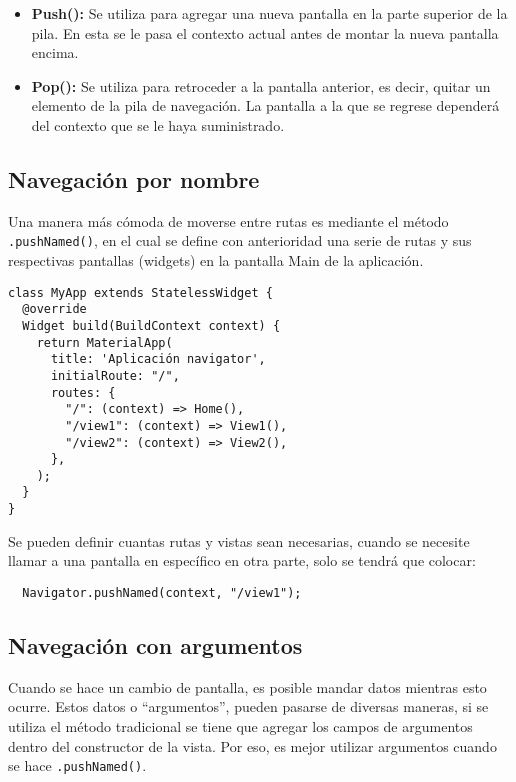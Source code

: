 \begin{itemize}
    \item \textbf{Push():} Se utiliza para agregar una nueva pantalla en la parte superior de la pila. En esta se le pasa el contexto actual antes de montar la nueva pantalla encima. 
    
    \item \textbf{Pop():} Se utiliza para retroceder a la pantalla anterior, es decir, quitar un elemento de la pila de navegación. La pantalla a la que se regrese dependerá del contexto que se le haya suministrado.
\end{itemize}

\subsection{Navegación por nombre}

Una manera más cómoda de moverse entre rutas es mediante el método \lstinline{.pushNamed()}, en el cual se define con anterioridad una serie de rutas y sus respectivas pantallas (widgets) en la pantalla Main de la aplicación.

\begin{center}
\begin{lstlisting}
class MyApp extends StatelessWidget {
  @override
  Widget build(BuildContext context) {
    return MaterialApp(
      title: 'Aplicación navigator',
      initialRoute: "/",
      routes: {
        "/": (context) => Home(),
        "/view1": (context) => View1(),
        "/view2": (context) => View2(),
      },
    );
  }
}
\end{lstlisting}
\end{center}

Se pueden definir cuantas rutas y vistas sean necesarias, cuando se necesite llamar a una pantalla en específico en otra parte, solo se tendrá que colocar:

\begin{center}
\begin{lstlisting}
  Navigator.pushNamed(context, "/view1");
\end{lstlisting}
\end{center}

\subsection{Navegación con argumentos}

Cuando se hace un cambio de pantalla, es posible mandar datos mientras esto ocurre. Estos datos o “argumentos”, pueden pasarse de diversas maneras, si se utiliza el método tradicional se tiene que agregar los campos de argumentos dentro del constructor de la vista. Por eso, es mejor utilizar argumentos cuando se hace \lstinline{.pushNamed()}.

